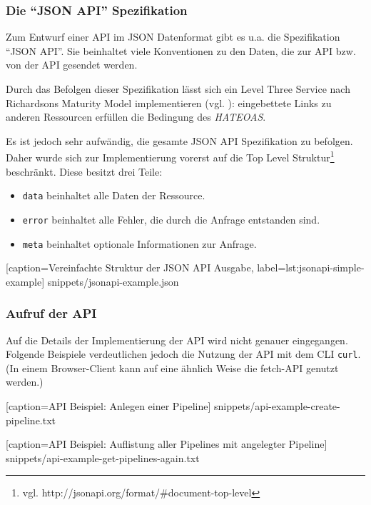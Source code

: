 \subsubsection{Die ``JSON API'' Spezifikation}
\label{subsec:jsonapi}

Zum Entwurf einer API im JSON Datenformat gibt es u.a. die Spezifikation ``JSON API''. Sie beinhaltet viele Konventionen zu den Daten, die zur API bzw. von der API gesendet werden.

Durch das Befolgen dieser Spezifikation lässt sich ein Level Three Service nach Richardsons Maturity Model implementieren (vgl. \citep[20]{Webber2010}): eingebettete Links zu anderen Ressourcen erfüllen die Bedingung des \emph{\ac{HATEOAS}}.

Es ist jedoch sehr aufwändig, die gesamte JSON API Spezifikation zu befolgen. Daher wurde sich zur Implementierung vorerst auf die Top Level Struktur\footnote{vgl. http://jsonapi.org/format/\#document-top-level} beschränkt. Diese besitzt drei Teile:

\begin{itemize}
  \item \texttt{data} beinhaltet alle Daten der Ressource.
  \item \texttt{error} beinhaltet alle Fehler, die durch die Anfrage entstanden sind.
  \item \texttt{meta} beinhaltet optionale Informationen zur Anfrage.
\end{itemize}


  [caption={Vereinfachte Struktur der JSON API Ausgabe},
  label={lst:jsonapi-simple-example}]
  {snippets/jsonapi-example.json}

\subsubsection{Aufruf der API}
\label{subsec:api-usage}

Auf die Details der Implementierung der API wird nicht genauer eingegangen. Folgende Beispiele verdeutlichen jedoch die Nutzung der API mit dem \ac{CLI} \texttt{curl}. (In einem Browser-Client kann auf eine ähnlich Weise die fetch-API genutzt werden.)


  [caption={API Beispiel: Anlegen einer Pipeline}]
  {snippets/api-example-create-pipeline.txt}


  [caption={API Beispiel: Auflistung aller Pipelines mit angelegter Pipeline}]
  {snippets/api-example-get-pipelines-again.txt}

